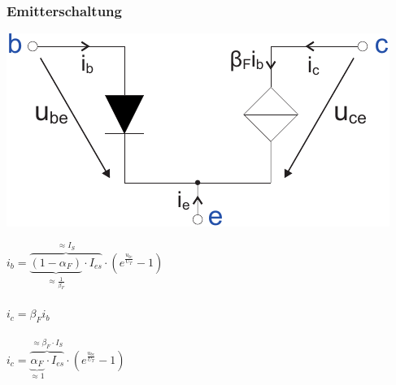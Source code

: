 \documentclass[a4paper,twocolumn,10pt]{article}
\begin{document}
\subsubsection*{Emitterschaltung}
\begin{minipage}[b]{0.23\textwidth}
\includegraphics[width=\textwidth]{Grafiken/Emitterschaltung_Vereinfachung}\\
\end{minipage}
\hfill
\begin{minipage}[b]{0.23\textwidth}
$i_b=\overbrace{\underbrace{(1-\alpha_F)}_{\approx \frac{1}{\beta_F}}\cdot I_{es}}^{\approx I_S}\cdot (e^{\frac{u_{be}}{U_T}}-1)$\\\\
$i_c=\beta_Fi_b$\\\\
$i_c=\overbrace{\underbrace{\alpha_F}_{\approx 1}\cdot I_{es}}^{\approx \beta_F\cdot I_S}\cdot (e^{\frac{u_{be}}{U_T}}-1)$\\
\end{minipage}
\end{document}
